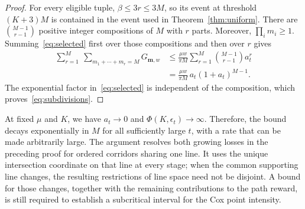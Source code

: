 \documentclass[11pt,letterpaper]{article}
\begin{document}
\begin{proof}
For every eligible tuple, $\beta\le3r\le3M$, so its event at threshold $(K+3)M$ is contained in the event used in Theorem~\ref{thm:uniform}. There are $\binom{M-1}{r-1}$ positive integer compositions of $M$ with $r$ parts. Moreover, $\prod_i m_i\ge1$. Summing~\eqref{eq:selected} first over those compositions and then over $r$ gives
\[
\begin{aligned}
 \sum_{r=1}^M\ \sum_{m_1+\cdots+m_r=M}G_{\boldsymbol m,w}
 &\le\frac{\mu w}{\pi M}\sum_{r=1}^M
                         \binom{M-1}{r-1}a_t^r\\
 &=\frac{\mu w}{\pi M}\,a_t(1+a_t)^{M-1}.
\end{aligned}
\]
The exponential factor in~\eqref{eq:selected} is independent of the composition, which proves~\eqref{eq:subdivisions}.
\end{proof}

At fixed $\mu$ and $K$, we have $a_t\to0$ and $\Phi(K,\epsilon_t)\to\infty$. Therefore, the bound decays exponentially in $M$ for all sufficiently large $t$, with a rate that can be made arbitrarily large. The argument resolves both growing losses in the preceding proof for ordered corridors sharing one line. It uses the unique intersection coordinate on that line at every stage; when the common supporting line changes, the resulting restrictions of line space need not be disjoint. A bound for those changes, together with the remaining contributions to the path reward, is still required to establish a subcritical interval for the Cox point intensity.



\end{document}
